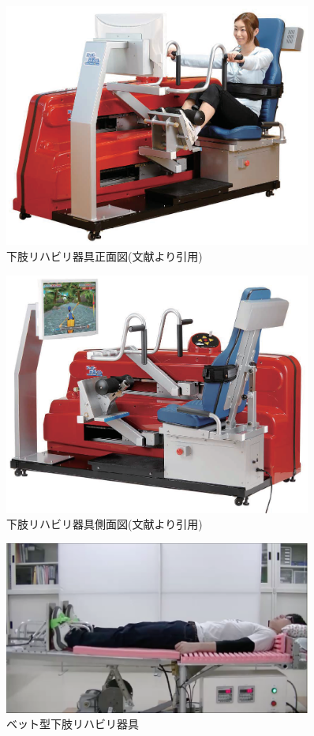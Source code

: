 \begin{figure}[tbp]
	\centering
			\includegraphics[width=0.9\textwidth]{chap1-figure/s-1.eps}
	\caption{下肢リハビリ器具正面図(文献\cite{フィットネスマシン}より引用)}
	\label{fig:smart-1}
\end{figure}

\begin{figure}[tbp]
	\centering
			\includegraphics[width=0.9\textwidth]{chap1-figure/s-2.eps}
	\caption{下肢リハビリ器具側面図(文献\cite{フィットネスマシン}より引用)}
	\label{fig:smart-2}
\end{figure}

\begin{figure}[tbp]
	\centering
			\includegraphics[width=0.9\textwidth]{chap1-figure/tadouhoku.eps}
	\caption{ベット型下肢リハビリ器具}
	\label{fig:tadouhokou}
\end{figure}

